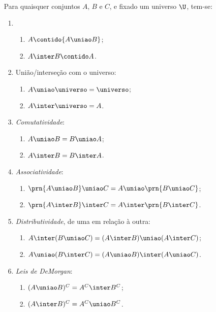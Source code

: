 \begin{proposition}
	\label{prop:uniao-e-intersecao}
	Para quaisquer conjuntos $A$, $B$ e $C$, e fixado um universo $\U$, tem-se:
	\begin{enumerate}
		\item
			\begin{enumerate}
				\label{prop:uniao-e-intersecao-inclusao}
				\item
					$A \contido {A \uniao B}$;
				\item
					${A \inter B} \contido A$.
			\end{enumerate}

		\item
			União/interseção com o universo:
			\begin{enumerate}
				\item $A \uniao \universo = \universo$;
				\item $A \inter \universo = A$.
			\end{enumerate}

		\item
			\emph{Comutatividade}:
			\begin{enumerate}
				\item $A \uniao B = B \uniao A$;
				\item $A \inter B = B \inter A$.
			\end{enumerate}

		\item
			\emph{Associatividade}:
			\begin{enumerate}
				\item $\prn{A \uniao B} \uniao C = A \uniao \prn{ B \uniao C}$;
				\item $\prn{A \inter B} \inter C = A \inter \prn{ B \inter C}$.
			\end{enumerate}

		\item
			\emph{Distributividade}, de uma em relação à outra:
			\begin{enumerate}
				\item $A \inter (B \uniao C) = (A \inter B) \uniao (A \inter C)$;
				\item $A \uniao (B \inter C) = (A \uniao B) \inter (A \uniao C)$.
			\end{enumerate}

		\item
			\label{prop:demorgan}
			\emph{Leis de DeMorgan}:
			\begin{enumerate}
				\item $(A \uniao B)^C = A^C \inter B^C$;
				\item $(A \inter B)^C = A^C \uniao B^C$.
			\end{enumerate}
	\end{enumerate}
\end{proposition}

